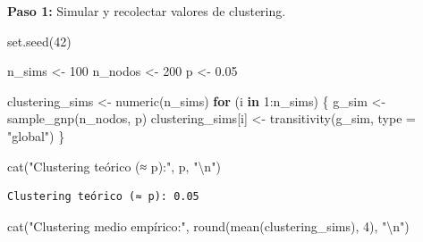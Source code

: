\documentclass[
  letterpaper,
  DIV=11,
  numbers=noendperiod]{scrreprt}
\newenvironment{Shaded}{\begin{snugshade}}{\end{snugshade}}
\newcommand{\AttributeTok}[1]{\textcolor[rgb]{0.40,0.45,0.13}{#1}}
\newcommand{\ControlFlowTok}[1]{\textcolor[rgb]{0.00,0.23,0.31}{\textbf{#1}}}
\newcommand{\DecValTok}[1]{\textcolor[rgb]{0.68,0.00,0.00}{#1}}
\newcommand{\FloatTok}[1]{\textcolor[rgb]{0.68,0.00,0.00}{#1}}
\newcommand{\FunctionTok}[1]{\textcolor[rgb]{0.28,0.35,0.67}{#1}}
\newcommand{\NormalTok}[1]{\textcolor[rgb]{0.00,0.23,0.31}{#1}}
\newcommand{\OtherTok}[1]{\textcolor[rgb]{0.00,0.23,0.31}{#1}}
\newcommand{\SpecialCharTok}[1]{\textcolor[rgb]{0.37,0.37,0.37}{#1}}
\newcommand{\StringTok}[1]{\textcolor[rgb]{0.13,0.47,0.30}{#1}}
\begin{document}
\begin{tcolorbox}[enhanced jigsaw, toprule=.15mm, colframe=quarto-callout-tip-color-frame, coltitle=black, titlerule=0mm, colback=white, breakable, leftrule=.75mm, arc=.35mm, bottomtitle=1mm, toptitle=1mm, rightrule=.15mm, bottomrule=.15mm, left=2mm, title=\textcolor{quarto-callout-tip-color}{\faLightbulb}\hspace{0.5em}{📝 Solución}, colbacktitle=quarto-callout-tip-color!10!white, opacityback=0, opacitybacktitle=0.6]

\textbf{Paso 1:} Simular y recolectar valores de clustering.

\begin{Shaded}
\begin{Highlighting}[]
\FunctionTok{set.seed}\NormalTok{(}\DecValTok{42}\NormalTok{)}

\NormalTok{n\_sims }\OtherTok{\textless{}{-}} \DecValTok{100}
\NormalTok{n\_nodos }\OtherTok{\textless{}{-}} \DecValTok{200}
\NormalTok{p }\OtherTok{\textless{}{-}} \FloatTok{0.05}

\NormalTok{clustering\_sims }\OtherTok{\textless{}{-}} \FunctionTok{numeric}\NormalTok{(n\_sims)}
\ControlFlowTok{for}\NormalTok{ (i }\ControlFlowTok{in} \DecValTok{1}\SpecialCharTok{:}\NormalTok{n\_sims) \{}
\NormalTok{  g\_sim }\OtherTok{\textless{}{-}} \FunctionTok{sample\_gnp}\NormalTok{(n\_nodos, p)}
\NormalTok{  clustering\_sims[i] }\OtherTok{\textless{}{-}} \FunctionTok{transitivity}\NormalTok{(g\_sim, }\AttributeTok{type =} \StringTok{"global"}\NormalTok{)}
\NormalTok{\}}

\FunctionTok{cat}\NormalTok{(}\StringTok{"Clustering teórico (≈ p):"}\NormalTok{, p, }\StringTok{"}\SpecialCharTok{\textbackslash{}n}\StringTok{"}\NormalTok{)}
\end{Highlighting}
\end{Shaded}

\begin{verbatim}
Clustering teórico (≈ p): 0.05 
\end{verbatim}

\begin{Shaded}
\begin{Highlighting}[]
\FunctionTok{cat}\NormalTok{(}\StringTok{"Clustering medio empírico:"}\NormalTok{, }\FunctionTok{round}\NormalTok{(}\FunctionTok{mean}\NormalTok{(clustering\_sims), }\DecValTok{4}\NormalTok{), }\StringTok{"}\SpecialCharTok{\textbackslash{}n}\StringTok{"}\NormalTok{)}
\end{Highlighting}
\end{Shaded}


\end{tcolorbox}
\end{document}
